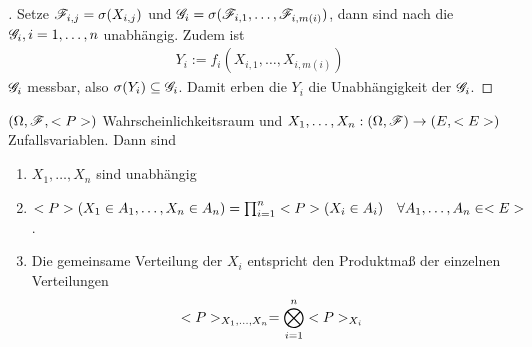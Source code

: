 \begin{proof}[]
	Setze $\F_{i,j} = \sigma(X_{i,j})$ und $\G_i = \sigma(\F_{i,1}, \dots, \F_{i,m(i)})$, dann sind nach  die $\G_i, i = 1,\dots,n$ unabhängig. Zudem ist
	\begin{align*}
	Y_i := f_i(X_{i,1}, \dots, X_{i,m(i)})
	\end{align*}
	$\G_i$ messbar, also $\sigma(Y_i) \subseteq \G_i$. Damit erben die $Y_i$ die Unabhängigkeit der $\G_i$.
\end{proof}
\begin{proposition}
	$(\O, \F, \P)$ Wahrscheinlichkeitsraum und $X_1, \dots, X_n: (\O,\F) \to (E, \E)$ Zufallsvariablen. Dann sind
	\begin{enumerate}
		\item $X_1, \dots, X_n$ sind unabhängig \label{prop:unabhZV1}
		\item $\P(X_1 \in A_1, \dots, X_n \in A_n) = \prod_{i=1}^n \P(X_i \in A_i)\quad \forall A_1, \dots, A_n \in \E$. \label{prop:unabhZV2}
		\item Die gemeinsame Verteilung der $X_i$ entspricht den Produktmaß der einzelnen Verteilungen \label{prop:unabhZV3}
		\begin{align*}
			\P_{X_1, \dots, X_n} = \bigotimes_{i=1}^n \P_{X_i}
		\end{align*}
	\end{enumerate}
\end{proposition}
